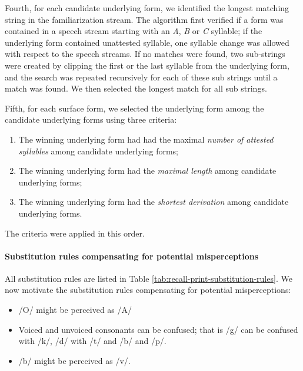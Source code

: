 \documentclass[]{article}
\providecommand{\tightlist}{%
  \setlength{\itemsep}{0pt}\setlength{\parskip}{0pt}}
\let\oldparagraph\paragraph
\renewcommand{\paragraph}[1]{\oldparagraph{#1}\mbox{}}
\begin{document}
Fourth, for each candidate underlying form, we identified the longest matching string in the familiarization stream. The algorithm first verified if a form was contained in a speech stream starting with an \emph{A}, \emph{B} or \emph{C} syllable; if the underlying form contained unattested syllable, one syllable change was allowed with respect to the speech streams. If no matches were found, two sub-strings were created by clipping the first or the last syllable from the underlying form, and the search was repeated recursively for each of these sub strings until a match was found. We then selected the longest match for all sub strings.

Fifth, for each surface form, we selected the underlying form among the candidate underlying forms using three criteria:

\begin{enumerate}
\def\labelenumi{\arabic{enumi}.}
\tightlist
\item
The winning underlying form had had the maximal \emph{number of attested syllables} among candidate underlying forms;
\item
The winning underlying form had the \emph{maximal length} among candidate underlying forms;
\item
The winning underlying form had the \emph{shortest derivation} among candidate underlying forms.
\end{enumerate}

The criteria were applied in this order.

\paragraph{Substitution rules compensating for potential misperceptions}\label{substitution-rules-compensating-for-potential-misperceptions}

All substitution rules are listed in Table \ref{tab:recall-print-substitution-rules}. We now motivate the substitution rules compensating for potential misperceptions:

\begin{itemize}
\tightlist
\item
  /O/ might be perceived as /A/
\item
Voiced and unvoiced consonants can be confused; that is /g/ can be confused with /k/, /d/ with /t/ and /b/ and /p/.
\item
  /b/ might be perceived as /v/.
\end{itemize}
\end{document}
